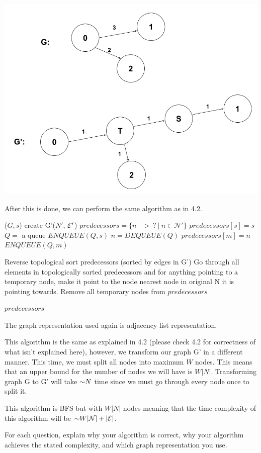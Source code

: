 \begin{problem}
\begin{questions}
\includegraphics[height=10cm]{assn 4_3.png}

After this is done, we can perform the same algorithm as in 4.2.

\begin{myalgo}{($G, s$)}
  \STATE create G'($N'$, $\mathcal{E}'$)
  \STATE $predecessors = \{n -> \:? \:|\: n \in \mathcal{N'}\}$
  \STATE $predecessors[s] = s$
  \STATE $Q =$ a queue
  \STATE $ENQUEUE(Q, s)$
    \STATE $n = DEQUEUE(Q)$
        \STATE $predecessors[m] = n$
        \STATE $ENQUEUE(Q, m)$
      \ENDIF
    \ENDFOR
  \ENDWHILE

  \STATE Reverse topological sort predecessors (sorted by edges in G')
  \STATE Go through all elements in topologically sorted predecessors and for anything pointing to a temporary node, make it point to the node nearest node in original N it is pointing towards.
  \STATE Remove all temporary nodes from $predecessors$

  \RETURN $predecessors$
\end{myalgo}

The graph representation used again is adjacency list representation.

This algorithm is the same as explained in 4.2 (please check 4.2 for correctness of what isn't explained here), however, we transform our graph G' in a different manner. This time, we must split all nodes into maximum $W$ nodes. This means that an upper bound for the number of nodes we will have is $W|N|$. Transforming graph G to G' will take $\mathord{\sim}N$ time since we must go through every node once to split it.

This algorithm is BFS but with $W|N|$ nodes meaning that the time complexity of this algorithm will be $\mathord{\sim}W\lvert \mathcal{N} \rvert + \lvert \mathcal{E} \rvert$.


\end{questions}
For each question, explain why your algorithm is correct, why your algorithm achieves the stated complexity, and which graph representation you use.
\end{problem}

\SUBMITMSG{}
\DEFAULTGRADING{}

